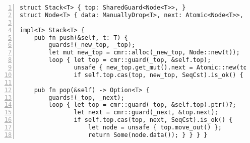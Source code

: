 \begin{lstlisting}[caption=\code{Stack::push} and \code{Stack::pop},label=lst:stack-ops,
    numbers=left, numberstyle=\color{gray}\ttfamily{}ST,
]
struct Stack<T> { top: SharedGuard<Node<T>>, }
struct Node<T> { data: ManuallyDrop<T>, next: Atomic<Node<T>>, }

impl<T> Stack<T> {
    pub fn push(&self, t: T) {
        guards!(_new_top, _top);
        let mut new_top = cmr::alloc(_new_top, Node::new(t));
        loop { let top = cmr::guard(_top, &self.top);
               unsafe { new_top.get_mut().next = Atomic::new(top); }
               if self.top.cas(top, new_top, SeqCst).is_ok() { break; } } }

    pub fn pop(&self) -> Option<T> {
        guards!(_top, _next);
        loop { let top = cmr::guard(_top, &self.top).ptr()?;
               let next = cmr::guard(_next, &top.next);
               if self.top.cas(top, next, SeqCst).is_ok() {
                   let node = unsafe { top.move_out() };
                   return Some(node.data()); } } } }
\end{lstlisting}
